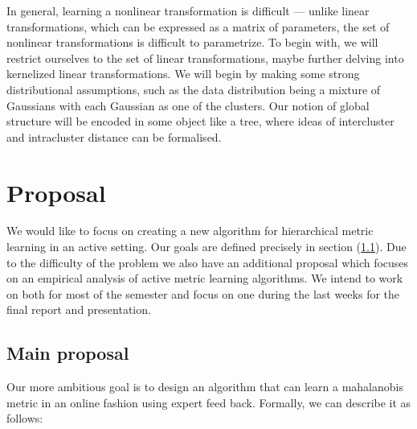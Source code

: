 \documentclass{article}
\begin{document}
In general, learning a nonlinear transformation is difficult — unlike linear transformations, which can be expressed as a matrix of parameters, the set of nonlinear transformations is difficult to parametrize. To begin with, we will restrict ourselves to the set of linear transformations, maybe further delving into kernelized linear transformations. We will begin by making some strong distributional assumptions, such as the data distribution being a mixture of Gaussians with each Gaussian as one of the clusters. Our notion of global structure will be encoded in some object like a tree, where ideas of intercluster and intracluster distance can be formalised.



\section{Proposal}
We would like to focus on creating a new algorithm for hierarchical metric learning in an active setting. 
Our goals are defined precisely in section (\ref{main-prop}).
Due to the difficulty of the problem we also have an additional proposal which focuses on an empirical analysis of active metric learning algorithms. 
We intend to work on both for most of the semester and focus on one during the last weeks for the final report and presentation. 


\subsection{Main proposal}
\label{main-prop}
Our more ambitious goal is to design an algorithm that can learn a mahalanobis metric in an online fashion using expert feed back. Formally, we can describe it as follows:
\end{document}
